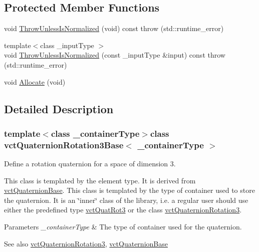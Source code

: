 \subsection*{Protected Member Functions}
\begin{DoxyCompactItemize}
\item 
void \hyperlink{classvct_quaternion_rotation3_base_a1e995a36965cc79f5832b090023f3c20}{Throw\+Unless\+Is\+Normalized} (void) const   throw (std\+::runtime\+\_\+error)
\item 
{\footnotesize template$<$class \+\_\+input\+Type $>$ }\\void \hyperlink{classvct_quaternion_rotation3_base_a6a2860093d561d93d4afed3b1e191259}{Throw\+Unless\+Is\+Normalized} (const \+\_\+input\+Type \&input) const   throw (std\+::runtime\+\_\+error)
\item 
void \hyperlink{classvct_quaternion_rotation3_base_a4dec998672be04b84b933b608fa65df2}{Allocate} (void)
\end{DoxyCompactItemize}


\subsection{Detailed Description}
\subsubsection*{template$<$class \+\_\+container\+Type$>$class vct\+Quaternion\+Rotation3\+Base$<$ \+\_\+container\+Type $>$}

Define a rotation quaternion for a space of dimension 3. 

This class is templated by the element type. It is derived from \hyperlink{classvct_quaternion_base}{vct\+Quaternion\+Base}. This class is templated by the type of container used to store the quaternion. It is an \char`\"{}inner\char`\"{} class of the library, i.\+e. a regular user should use either the predefined type \hyperlink{vct_transformation_types_8h_a595c3c83888ed4fb8ae707126efd25e3}{vct\+Quat\+Rot3} or the class \hyperlink{classvct_quaternion_rotation3}{vct\+Quaternion\+Rotation3}.


\begin{DoxyParams}{Parameters}
{\em \+\_\+container\+Type} & The type of container used for the quaternion.\\
\hline
\end{DoxyParams}
\begin{DoxySeeAlso}{See also}
\hyperlink{classvct_quaternion_rotation3}{vct\+Quaternion\+Rotation3}, \hyperlink{classvct_quaternion_base}{vct\+Quaternion\+Base} 
\end{DoxySeeAlso}


